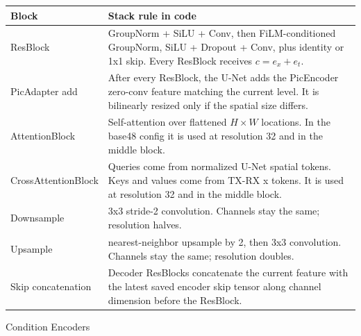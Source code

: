 \documentclass[10pt,landscape]{article}
\begin{document}
\vspace{5mm}

\small
\begin{tabular}{>{\raggedright\arraybackslash}p{46mm} >{\raggedright\arraybackslash}p{350mm}}
\toprule
Block & Stack rule in code \\
\midrule
ResBlock & GroupNorm + SiLU + Conv, then FiLM-conditioned GroupNorm, SiLU + Dropout + Conv, plus identity or 1x1 skip. Every ResBlock receives $c=e_x+e_t$. \\
PicAdapter add & After every ResBlock, the U-Net adds the PicEncoder zero-conv feature matching the current level. It is bilinearly resized only if the spatial size differs. \\
AttentionBlock & Self-attention over flattened $H \times W$ locations. In the base48 config it is used at resolution 32 and in the middle block. \\
CrossAttentionBlock & Queries come from normalized U-Net spatial tokens. Keys and values come from TX-RX x tokens. It is used at resolution 32 and in the middle block. \\
Downsample & 3x3 stride-2 convolution. Channels stay the same; resolution halves. \\
Upsample & nearest-neighbor upsample by 2, then 3x3 convolution. Channels stay the same; resolution doubles. \\
Skip concatenation & Decoder ResBlocks concatenate the current feature with the latest saved encoder skip tensor along channel dimension before the ResBlock. \\
\bottomrule
\end{tabular}
\normalsize

\newpage

\begin{center}
{\Large Condition Encoders}
\end{center}
\end{document}

